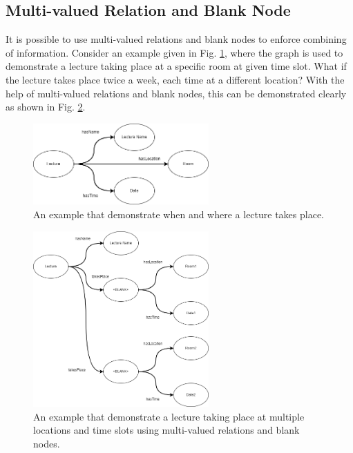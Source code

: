 \subsection{Multi-valued Relation and Blank Node}

It is possible to use multi-valued relations and blank nodes to enforce combining of information. Consider an example given in Fig. \ref{fig:lectureexp}, where the graph is used to demonstrate a lecture taking place at a specific room at given time slot. What if the lecture takes place twice a week, each time at a different location? With the help of multi-valued relations and blank nodes, this can be demonstrated clearly as shown in Fig. \ref{fig:lectureexp2}.
\begin{figure}[htbp]
	\centering
	\includegraphics[width=0.6\textwidth]{./chapters/ch-semanticwebarchitecture/figures/lectureexp.png}
	\caption{An example that demonstrate when and where a lecture takes place.}
	\label{fig:lectureexp}
\end{figure}

\begin{figure}[htbp]
	\centering
	\includegraphics[width=0.6\textwidth]{./chapters/ch-semanticwebarchitecture/figures/lectureexp2.png}
	\caption{An example that demonstrate a lecture taking place at multiple locations and time slots using multi-valued relations and blank nodes.}
	\label{fig:lectureexp2}
\end{figure}

